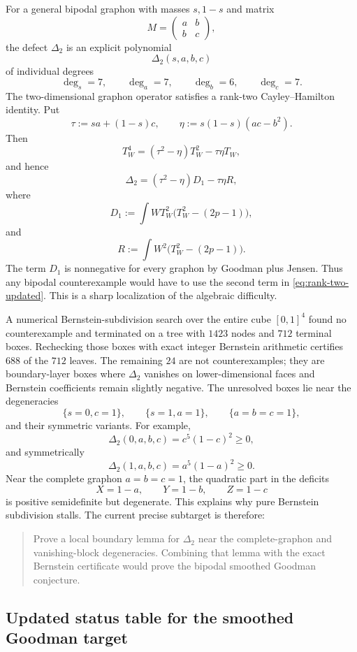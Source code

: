 \documentclass[11pt]{article}
\theoremstyle{definition}
\begin{document}
For a general bipodal graphon with masses $s,1-s$ and matrix
\[
  M=\begin{pmatrix}a&b\\b&c\end{pmatrix},
\]
the defect $\Delta_2$ is an explicit polynomial
\[
  \Delta_2(s,a,b,c)
\]
of individual degrees
\[
  \deg_s=7,
  \qquad \deg_a=7,
  \qquad \deg_b=6,
  \qquad \deg_c=7.
\]
The two-dimensional graphon operator satisfies a rank-two Cayley--Hamilton identity.  Put
\[
  \tau:=sa+(1-s)c,
  \qquad
  \eta:=s(1-s)(ac-b^2).
\]
Then
\[
  T_W^4=(\tau^2-\eta)T_W^2-\tau\eta T_W,
\]
and hence
\begin{equation}\label{eq:rank-two-updated}
  \boxed{
  \Delta_2=(\tau^2-\eta)D_1-\tau\eta R,
  }
\end{equation}
where
\[
  D_1:=\int WT_W^2\bigl(T_W^2-(2p-1)\bigr),
\]
and
\[
  R:=\int W^2\bigl(T_W^2-(2p-1)\bigr).
\]
The term $D_1$ is nonnegative for every graphon by Goodman plus Jensen.  Thus any bipodal counterexample would have to use the second term in \eqref{eq:rank-two-updated}.  This is a sharp localization of the algebraic difficulty.

A numerical Bernstein-subdivision search over the entire cube $[0,1]^4$ found no counterexample and terminated on a tree with $1423$ nodes and $712$ terminal boxes.  Rechecking those boxes with exact integer Bernstein arithmetic certifies $688$ of the $712$ leaves.  The remaining $24$ are not counterexamples; they are boundary-layer boxes where $\Delta_2$ vanishes on lower-dimensional faces and Bernstein coefficients remain slightly negative.  The unresolved boxes lie near the degeneracies
\[
  \{s=0,c=1\},
  \qquad
  \{s=1,a=1\},
  \qquad
  \{a=b=c=1\},
\]
and their symmetric variants.  For example,
\[
  \Delta_2(0,a,b,c)=c^5(1-c)^2\ge0,
\]
and symmetrically
\[
  \Delta_2(1,a,b,c)=a^5(1-a)^2\ge0.
\]
Near the complete graphon $a=b=c=1$, the quadratic part in the deficits
\[
  X=1-a,
  \qquad Y=1-b,
  \qquad Z=1-c
\]
is positive semidefinite but degenerate.  This explains why pure Bernstein subdivision stalls.  The current precise subtarget is therefore:
\begin{quote}
Prove a local boundary lemma for $\Delta_2$ near the complete-graphon and vanishing-block degeneracies.  Combining that lemma with the exact Bernstein certificate would prove the bipodal smoothed Goodman conjecture.
\end{quote}

\subsection{Updated status table for the smoothed Goodman target}
\end{document}
